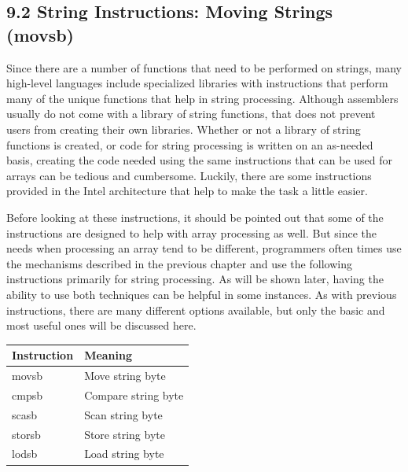 \documentclass[10pt]{book}
\begin{document}
\subsection*{9.2 String Instructions: Moving Strings (movsb)}
Since there are a number of functions that need to be performed on strings, many high-level languages include specialized libraries with instructions that perform many of the unique functions that help in string processing. Although assemblers usually do not come with a library of string functions, that does not prevent users from creating their own libraries. Whether or not a library of string functions is created, or code for string processing is written on an as-needed basis, creating the code needed using the same instructions that can be used for arrays can be tedious and cumbersome. Luckily, there are some instructions provided in the Intel architecture that help to make the task a little easier.

Before looking at these instructions, it should be pointed out that some of the instructions are designed to help with array processing as well. But since the needs when processing an array tend to be different, programmers often times use the mechanisms described in the previous chapter and use the following instructions primarily for string processing. As will be shown later, having the ability to use both techniques can be helpful in some instances. As with previous instructions, there are many different options available, but only the basic and most useful ones will be discussed here.

\begin{center}
\begin{tabular}{|l|l|}
\hline
Instruction & Meaning \\
\hline
movsb & Move string byte \\
\hline
cmpsb & Compare string byte \\
\hline
scasb & Scan string byte \\
\hline
storsb & Store string byte \\
\hline
lodsb & Load string byte \\
\hline
\end{tabular}
\end{center}
\end{document}
